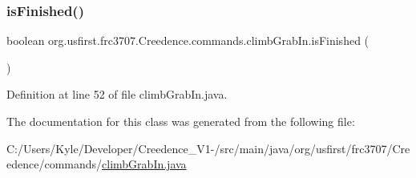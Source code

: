 \subsubsection{\texorpdfstring{isFinished()}{isFinished()}}
{\footnotesize\ttfamily boolean org.\+usfirst.\+frc3707.\+Creedence.\+commands.\+climb\+Grab\+In.\+is\+Finished (\begin{DoxyParamCaption}{ }\end{DoxyParamCaption})\hspace{0.3cm}{\ttfamily [protected]}}



Definition at line 52 of file climb\+Grab\+In.\+java.



The documentation for this class was generated from the following file\+:\begin{DoxyCompactItemize}
\item 
C\+:/\+Users/\+Kyle/\+Developer/\+Creedence\+\_\+\+V1-\//src/main/java/org/usfirst/frc3707/\+Creedence/commands/\mbox{\hyperlink{climb_grab_in_8java}{climb\+Grab\+In.\+java}}\end{DoxyCompactItemize}
